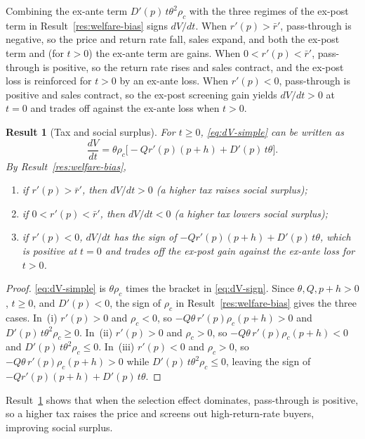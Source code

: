 \documentclass[11pt]{article}
\newtheorem{result}{Result}
\begin{document}
Combining the ex-ante term $D'(p)\,t\theta^{2}\rho_c$ with the three regimes
of the ex-post term in Result~\ref{res:welfare-bias} signs $dV/dt$. When
$r'(p)>\bar{r}'$, pass-through is negative, so the price and return rate fall,
sales expand, and both the ex-post term and (for $t>0$) the ex-ante term are
gains. When $0<r'(p)<\bar{r}'$, pass-through is positive, so the return rate
rises and sales contract, and the ex-post loss is reinforced for $t>0$ by an
ex-ante loss. When $r'(p)<0$, pass-through is positive and sales contract, so
the ex-post screening gain yields $dV/dt>0$ at $t=0$ and trades off against
the ex-ante loss when $t>0$.

\begin{result}[Tax and social surplus]
\label{res:tax-welfare}
For $t\geq 0$, \eqref{eq:dV-simple} can be written as
\begin{equation}
  \frac{dV}{dt}
  =
  \theta\rho_c\bigl[-Qr'(p)(p+h)+D'(p)\,t\theta\bigr].
  \label{eq:dV-sign}
\end{equation}
By Result~\ref{res:welfare-bias},
\begin{enumerate}
\item[(i)] if $r'(p)>\bar{r}'$, then $dV/dt>0$ (a higher tax raises
social surplus);
\item[(ii)] if $0<r'(p)<\bar{r}'$, then $dV/dt<0$ (a higher tax lowers
social surplus);
\item[(iii)] if $r'(p)<0$, $dV/dt$ has the sign of
$-Qr'(p)(p+h)+D'(p)\,t\theta$, which is positive at $t=0$ and trades off the
ex-post gain against the ex-ante loss for $t>0$.
\end{enumerate}
\end{result}
\begin{proof}
\eqref{eq:dV-simple} is $\theta\rho_c$ times the bracket in \eqref{eq:dV-sign}. Since $\theta,Q,p+h>0$, $t\geq 0$, and $D'(p)<0$, the sign of $\rho_c$ in Result~\ref{res:welfare-bias} gives the three cases. In~(i) $r'(p)>0$ and $\rho_c<0$, so $-Q\theta\,r'(p)\rho_c(p+h)>0$ and $D'(p)\,t\theta^{2}\rho_c\geq 0$. In~(ii) $r'(p)>0$ and $\rho_c>0$, so $-Q\theta\,r'(p)\rho_c(p+h)<0$ and $D'(p)\,t\theta^{2}\rho_c\leq 0$. In~(iii) $r'(p)<0$ and $\rho_c>0$, so $-Q\theta\,r'(p)\rho_c(p+h)>0$ while $D'(p)\,t\theta^{2}\rho_c\leq 0$, leaving the sign of $-Qr'(p)(p+h)+D'(p)\,t\theta$.
\end{proof}

Result~\ref{res:tax-welfare} shows that when the selection effect dominates,
pass-through is positive, so a higher tax raises the price and screens out
high-return-rate buyers, improving social surplus.
\end{document}
